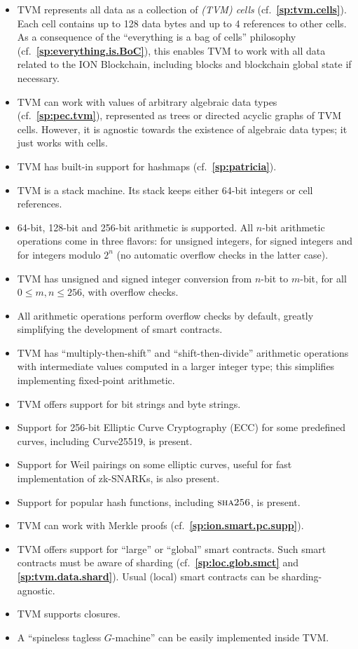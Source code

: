 \documentclass[12pt,oneside]{article}
\def\refpoint#1{{\rm\textbf{\ref{#1}}}}
\let\ptref=\refpoint
\def\opsc#1{\operatorname{\textsc{#1}}}
\def\Sha{\opsc{sha256}}
\begin{document}
\begin{itemize}
\item TVM represents all data as a collection of {\em (TVM) cells\/}
  (cf.~\ptref{sp:tvm.cells}). Each cell contains up to 128 data bytes
  and up to 4 references to other cells. As a consequence of the
  ``everything is a bag of cells'' philosophy
  (cf.~\ptref{sp:everything.is.BoC}), this enables TVM to work with
  all data related to the ION Blockchain, including blocks and
  blockchain global state if necessary.
\item TVM can work with values of arbitrary algebraic data types
  (cf.~\ptref{sp:pec.tvm}), represented as trees or directed acyclic
  graphs of TVM cells. However, it is agnostic towards the existence
  of algebraic data types; it just works with cells.
\item TVM has built-in support for hashmaps (cf.~\ptref{sp:patricia}).
\item TVM is a stack machine. Its stack keeps either 64-bit integers
  or cell references.
\item 64-bit, 128-bit and 256-bit arithmetic is supported. All $n$-bit
  arithmetic operations come in three flavors: for unsigned integers,
  for signed integers and for integers modulo $2^n$ (no automatic
  overflow checks in the latter case).
\item TVM has unsigned and signed integer conversion from $n$-bit to
  $m$-bit, for all $0\leq m,n\leq 256$, with overflow checks.
\item All arithmetic operations perform overflow checks by default,
  greatly simplifying the development of smart contracts.
\item TVM has ``multiply-then-shift'' and ``shift-then-divide''
  arithmetic operations with intermediate values computed in a larger
  integer type; this simplifies implementing fixed-point arithmetic.
\item TVM offers support for bit strings and byte strings.
\item Support for 256-bit Elliptic Curve Cryptography (ECC) for some
  predefined curves, including Curve25519, is present.
\item Support for Weil pairings on some elliptic curves, useful for
  fast implementation of zk-SNARKs, is also present.
\item Support for popular hash functions, including $\Sha$, is
  present.
\item TVM can work with Merkle proofs
  (cf.~\ptref{sp:ion.smart.pc.supp}).
\item TVM offers support for ``large'' or ``global'' smart
  contracts. Such smart contracts must be aware of sharding
  (cf.~\ptref{sp:loc.glob.smct} and \ptref{sp:tvm.data.shard}). Usual
  (local) smart contracts can be sharding-agnostic.
\item TVM supports closures.
\item A ``spineless tagless $G$-machine'' \cite{STGM} can be easily
  implemented inside TVM.
\end{itemize}
\end{document}
